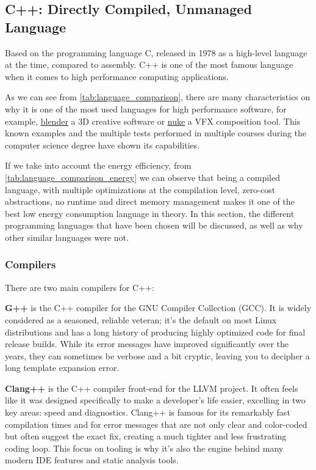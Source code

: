 \subsection{C++: Directly Compiled, Unmanaged Language}
Based on the programming language C, released in 1978 as a high-level language at the time, compared to assembly. C++ is one of the most famous language when it comes to high performance computing applications.


As we can see from \autoref{tab:language_comparison}, there are many characteristics on why it is one of the most used languages for high performance software, for example, \underline{\href{https://blender.org}{blender}} a 3D creative software or \underline{\href{https://www.foundry.com/products/nuke-family}{nuke}} a VFX composition tool. This known examples and the multiple tests performed in multiple courses during the computer science degree have shown its capabilities.

If we take into account the energy efficiency, from \autoref{tab:language_comparison_energy} we can observe that being a compiled language, with multiple optimizations at the compilation level, zero-cost abstractions, no \gls{runtime} and direct memory management makes it one of the best low energy consumption language in theory.
In this section, the different programming languages that have been chosen will be discussed, as well as why other similar languages were not.



\subsubsection{Compilers}

There are two main compilers for C++:

\textbf{G++} is the C++ compiler for the GNU Compiler Collection (GCC). It is widely considered as a seasoned, reliable veteran; it's the default on most Linux distributions and has a long history of producing highly optimized code for final release builds. While its error messages have improved significantly over the years, they can sometimes be verbose and a bit cryptic, leaving you to decipher a long template expansion error.

\textbf{Clang++} is the C++ compiler front-end for the \gls{LLVM} project. It often feels like it was designed specifically to make a developer's life easier, excelling in two key areas: speed and diagnostics. Clang++ is famous for its remarkably fast compilation times and for error messages that are not only clear and color-coded but often suggest the exact fix, creating a much tighter and less frustrating coding loop. This focus on tooling is why it's also the engine behind many modern IDE features and static analysis tools.


